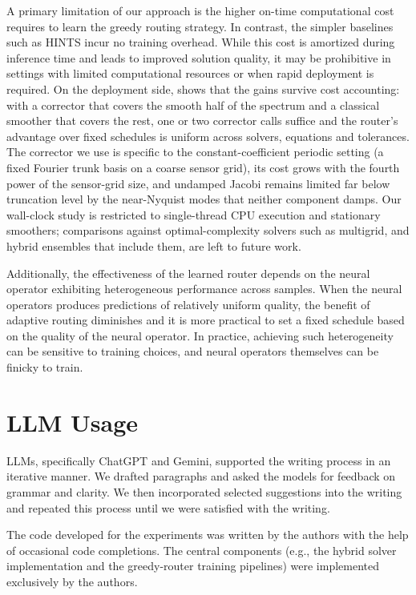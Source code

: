 \documentclass{article}
\newcommand{\edit}[1]{{\color{red}#1}}
\begin{document}
A primary limitation of our approach is the higher on-time computational cost requires to learn the greedy routing strategy. In contrast, the simpler baselines such as HINTS incur no training overhead. While this cost is amortized during inference time and leads to improved solution quality, it may be prohibitive in settings with limited computational resources or when rapid deployment is required. \edit{On the deployment side,  shows that the gains survive cost accounting: with a corrector that covers the smooth half of the spectrum and a classical smoother that covers the rest, one or two corrector calls suffice and the router's advantage over fixed schedules is uniform across solvers, equations and tolerances. The corrector we use is specific to the constant-coefficient periodic setting (a fixed Fourier trunk basis on a coarse sensor grid), its cost grows with the fourth power of the sensor-grid size, and undamped Jacobi remains limited far below truncation level by the near-Nyquist modes that neither component damps. Our wall-clock study is restricted to single-thread CPU execution and stationary smoothers; comparisons against optimal-complexity solvers such as multigrid, and hybrid ensembles that include them, are left to future work.}

Additionally, the effectiveness of the learned router depends on the neural operator exhibiting heterogeneous performance across samples. When the neural operators produces predictions of relatively uniform quality, the benefit of adaptive routing diminishes and it is more practical to set a fixed schedule based on the quality of the neural operator. In practice, achieving such heterogeneity can be sensitive to training choices, and neural operators themselves can be finicky to train.


\section{LLM Usage}

LLMs, specifically ChatGPT and Gemini, supported the writing process in an iterative manner. We drafted paragraphs and asked the models for feedback on grammar and clarity. We then incorporated selected suggestions into the writing and repeated this process until we were satisfied with the writing. 

The code developed for the experiments was written by the authors with the help of occasional code completions. The central components (e.g., the hybrid solver implementation and the greedy-router training pipelines) were implemented exclusively by the authors.
\end{document}
